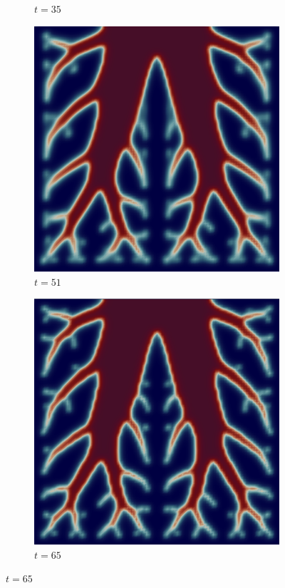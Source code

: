 \begin{figure}[H]
\begin{subfigure}{.4\textwidth}
        \caption{$t = 35$}
    \end{subfigure}
    \begin{subfigure}{.4\textwidth}
        \includegraphics[width=\textwidth]{imgs/UnitSquare_1/seventh.png}
        \caption{$t = 51$}
    \end{subfigure}
    \begin{subfigure}{.4\textwidth}
        \includegraphics[width=\textwidth]{imgs/UnitSquare_1/eighth.png}
        \caption{$t = 65$}
    \end{subfigure}
\end{figure}

